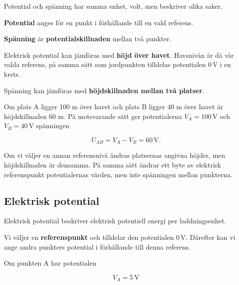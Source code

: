\documentclass[
  swedish,
  11pt,
  a4paper,
  DIV=11,
  numbers=noendperiod,
  twoside,
  open=any]{scrreprt}
\begin{document}
Potential och spänning har samma enhet, volt, men beskriver olika saker.

\textbf{Potential} anges för en punkt i förhållande till en vald
referens.

\textbf{Spänning} är \textbf{potentialskillnaden} mellan två punkter.

\begin{tcolorbox}[enhanced jigsaw, arc=.35mm, bottomrule=.15mm, bottomtitle=1mm, breakable, colback=white, colbacktitle=quarto-callout-tip-color!10!white, colframe=quarto-callout-tip-color-frame, coltitle=black, left=2mm, leftrule=.75mm, opacityback=0, opacitybacktitle=0.6, rightrule=.15mm, title=\textcolor{quarto-callout-tip-color}{\faLightbulb}\hspace{0.5em}{Potential och spänning -- jämför med höjd}, titlerule=0mm, toprule=.15mm, toptitle=1mm]

Elektrisk potential kan jämföras med \textbf{höjd över havet}. Havsnivån
är då vår valda referens, på samma sätt som jordpunkten tilldelas
potentialen \(0\,\mathrm{V}\) i en krets.

Spänning kan jämföras med \textbf{höjdskillnaden mellan två platser}.

Om plats A ligger 100 m över havet och plats B ligger 40 m över havet är
höjdskillnaden 60 m. På motsvarande sätt ger potentialerna
\(V_A = 100\,\mathrm{V}\) och \(V_B = 40\,\mathrm{V}\) spänningen

\[
U_{AB} = V_A - V_B = 60\,\mathrm{V}.
\]

Om vi väljer en annan referensnivå ändras platsernas angivna höjder, men
höjdskillnaden är densamma. På samma sätt ändrar ett byte av elektrisk
referenspunkt potentialernas värden, men inte spänningen mellan
punkterna.

\end{tcolorbox}

\subsection{Elektrisk potential}\label{sec-grunder-elektrisk-potential}

Elektrisk potential beskriver elektrisk potentiell energi per
laddningsenhet.

Vi väljer en \textbf{referenspunkt} och tilldelar den potentialen
\(0\,\mathrm{V}\). Därefter kan vi ange andra punkters potential i
förhållande till denna referens.

Om punkten A har potentialen

\[
V_A = 5\,\mathrm{V}
\]
\end{document}
